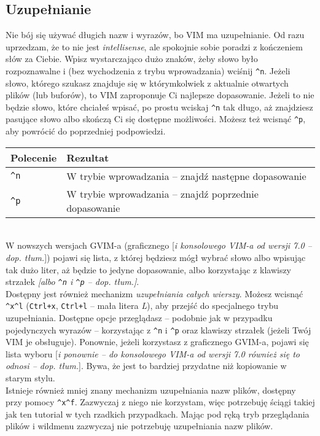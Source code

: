 \documentclass[a4paper,12pt]{article}
\begin{document}
\subsection{Uzupełnianie}
Nie bój się używać długich nazw i wyrazów, bo VIM ma uzupełnianie. Od razu uprzedzam, że to nie jest {\it intellisense}, ale spokojnie sobie poradzi z kończeniem słów za Ciebie. Wpisz wystarczająco dużo znaków, żeby słowo było rozpoznawalne i (bez wychodzenia z trybu wprowadzania) wciśnij {\tt \^{}n}. Jeżeli słowo, którego szukasz znajduje się w którymkolwiek z aktualnie otwartych plików (lub buforów), to VIM zaproponuje Ci najlepsze dopasowanie. Jeżeli to nie będzie słowo, które chciałeś wpisać, po prostu wciskaj {\tt \^{}n} tak długo, aż znajdziesz pasujące słowo albo skończą Ci się dostępne możliwości. Możesz też wcisnąć {\tt \^{}p}, aby powrócić do poprzedniej podpowiedzi.

\begin{tabular}{ l | p{} }
{\bf Polecenie} & {\bf Rezultat} \\ \hline
{\tt \^{}n} & W trybie wprowadzania – znajdź następne dopasowanie \\
{\tt \^{}p} & W trybie wprowadzania – znajdź poprzednie dopasowanie \\ \hline
\end{tabular}\\

\noindent
W nowszych wersjach GVIM-a (graficznego [{\it i konsolowego VIM-a od wersji 7.0 – dop. tłum.}]) pojawi się lista, z której będziesz mógł wybrać słowo albo wpisując tak dużo liter, aż będzie to jedyne dopasowanie, albo korzystając z klawiszy strzałek {\it [albo \texttt{\textit{\^{}n}} i \texttt{\textit{\^{}p}} – dop. tłum.]}.\\
Dostępny jest również mechanizm {\it uzupełniania całych wierszy}. Możesz wcisnąć {\tt \^{}x\^{}l} ({\tt Ctrl+x}, {\tt Ctrl+l} – mała litera {\it L}), aby przejść do specjalnego trybu uzupełniania. Dostępne opcje przeglądasz – podobnie jak w przypadku pojedynczych wyrazów – korzystając z {\tt \^{}n} i {\tt \^{}p} oraz klawiszy strzałek (jeżeli Twój VIM je obsługuje). Ponownie, jeżeli korzystasz z graficznego GVIM-a, pojawi się lista wyboru [{\it i ponownie – do konsolowego VIM-a od wersji 7.0 również się to odnosi – dop. tłum.}]. Bywa, że jest to bardziej przydatne niż kopiowanie w starym stylu.\\
Istnieje również mniej znany mechanizm uzupełniania nazw plików, dostępny przy pomocy {\tt \^{}x\^{}f}. Zazwyczaj z niego nie korzystam, więc potrzebuję ściągi takiej jak ten tutorial w tych rzadkich przypadkach. Mając pod ręką tryb przeglądania plików i wildmenu zazwyczaj nie potrzebuję uzupełniania nazw plików.
\end{document}
